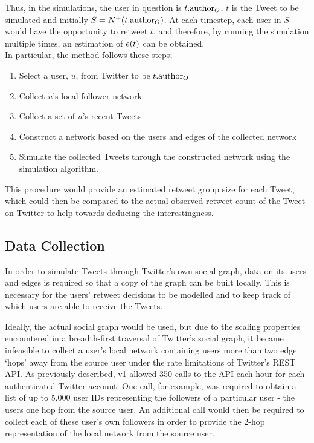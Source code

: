 Thus, in the simulations, the user in question is $t.\textrm{author}_O$, $t$ is the Tweet to be simulated and initially $S = N^+(t.\textrm{author}_O)$. At each timestep, each user in $S$ would have the opportunity to retweet $t$, and therefore, by running the simulation multiple times, an estimation of $e(t)$ can be obtained.\\
In particular, the method follows these steps;
\begin{enumerate}
    \item Select a user, $u$, from Twitter to be $t.\textrm{author}_O$
    \item Collect $u$'s local follower network 
    \item Collect a set of $u$'s recent Tweets
    \item Construct a network based on the users and edges of the collected network
    \item Simulate the collected Tweets through the constructed network using the simulation algorithm.
\end{enumerate}

This procedure would provide an estimated retweet group size for each Tweet, which could then be compared to the actual observed retweet count of the Tweet on Twitter to help towards deducing the interestingness.


\subsection{Data Collection}
In order to simulate Tweets through Twitter's own social graph, data on its users and edges is required so that a copy of the graph can be built locally. This is necessary for the users' retweet decisions to be modelled and to keep track of which users are able to receive the Tweets.

Ideally, the actual social graph would be used, but due to the scaling properties encountered in a breadth-first traversal of Twitter's social graph, it became infeasible to collect a user's local network containing users more than two edge `hops' away from the source user under the rate limitations of Twitter's REST API. As previously described, v1 allowed 350 calls to the API each hour for each authenticated Twitter account. One call, for example, was required to obtain a list of up to 5,000 user IDs representing the followers of a particular user - the users one hop from the source user. An additional call would then be required to collect each of these user's own followers in order to provide the 2-hop representation of the local network from the source user.


